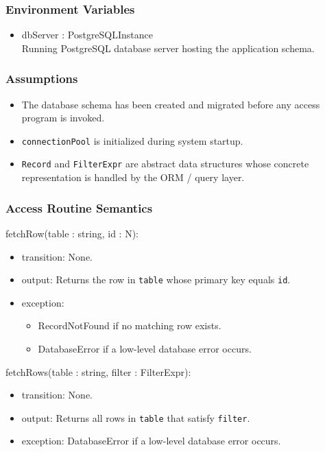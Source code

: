 \documentclass[12pt, titlepage]{article}
\begin{document}
\subsubsection{Environment Variables}

\begin{itemize}
  \item dbServer : PostgreSQLInstance \\
        Running PostgreSQL database server hosting the application schema.
\end{itemize}

\subsubsection{Assumptions}

\begin{itemize}
  \item The database schema has been created and migrated before any access
        program is invoked.
  \item \texttt{connectionPool} is initialized during system startup.
  \item \texttt{Record} and \texttt{FilterExpr} are abstract data structures whose
        concrete representation is handled by the ORM / query layer.
\end{itemize}

\subsubsection{Access Routine Semantics}

\noindent fetchRow(table : string, id : N):
\begin{itemize}
  \item transition: None.
  \item output: Returns the row in \texttt{table} whose primary key equals \texttt{id}.
  \item exception:
        \begin{itemize}
          \item RecordNotFound if no matching row exists.
          \item DatabaseError if a low-level database error occurs.
        \end{itemize}
\end{itemize}

\noindent fetchRows(table : string, filter : FilterExpr):
\begin{itemize}
  \item transition: None.
  \item output: Returns all rows in \texttt{table} that satisfy \texttt{filter}.
  \item exception: DatabaseError if a low-level database error occurs.
\end{itemize}
\end{document}
